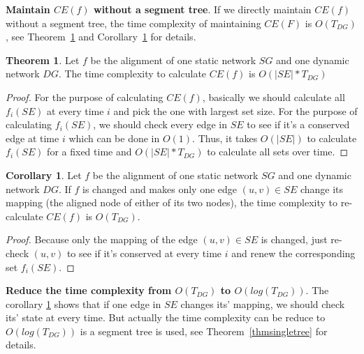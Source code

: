 \documentclass{bioinfo}
\theoremstyle{definition}
\newtheorem{thm}{\textbf{Theorem}}[section]%
\newtheorem{cor}{\textbf{Corollary}}[thm]%
\begin{document}
\textbf{Maintain $CE(f)$ without a segment tree}. If we directly maintain $CE(f)$ without a segment tree, the time complexity of maintaining $CE(F)$ is $O(T_{DG})$, see Theorem~\ref{thmsingleforce} and Corollary~\ref{corsingleforce} for details.
\begin{thm}
\label{thmsingleforce}
Let $f$ be the alignment of one static network $SG$ and one dynamic network $DG$. The time complexity to calculate $CE(f)$ is $O(|SE|*T_{DG})$
\end{thm}
\begin{proof}
For the purpose of calculating $CE(f)$, basically we should calculate all $f_i(SE)$ at every time $i$ and pick the one with largest set size. For the purpose of calculating $f_i(SE)$, we should check every edge in $SE$ to see if it's a conserved edge at time $i$ which can be done in $O(1)$. Thus, it takes $O(|SE|)$ to calculate $f_i(SE)$ for a fixed time and $O(|SE|*T_{DG})$ to calculate all sets over time. 
\end{proof}
\begin{cor}
\label{corsingleforce}
Let $f$ be the alignment of one static network $SG$ and one dynamic network $DG$. If $f$ is changed and makes only one edge $(u,v)\in SE$ change its mapping (the aligned node of either of its two nodes), the time complexity to re-calculate $CE(f)$ is $O(T_{DG})$. 
\end{cor}
\begin{proof}
Because only the mapping of the edge $(u,v)\in SE$ is changed, just re-check $(u,v)$ to see if it's conserved at every time $i$ and renew the corresponding set $f_i(SE)$.
\end{proof}


\textbf{Reduce the time complexity from $O(T_{DG})$ to $O(log(T_{DG}))$}. The corollary \ref{corsingleforce} shows that if one edge in $SE$ changes its' mapping, we should check its' state at every time. But actually the time complexity can be reduce to $O(log(T_{DG}))$ is a segment tree is used, see Theorem~\ref{thmsingletree} for details.
\end{document}
